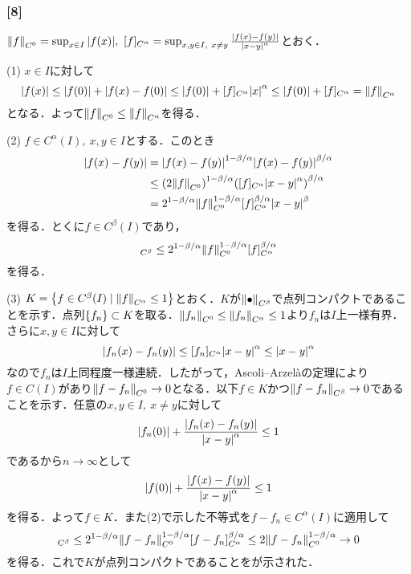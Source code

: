 \documentclass[a4j]{ltjsarticle}
\newcommand{\1}{\mathbbm{1}}
\numberwithin{equation}{section}
\theoremstyle{definition}
\begin{document}
\subsubsection*{[8]}
$\norm{f}_{C^0}=\sup_{x\in I}\abs{f(x)},\ [f]_{C^{\alpha}}=\sup_{x,y\in I,\ x\neq y}\frac{\abs{f(x)-f(y)}}{\abs{x-y}^{\alpha}}$とおく．

(1) $x\in I$に対して
\begin{equation}
    \abs{f(x)}\leq \abs{f(0)}+\abs{f(x)-f(0)}\leq \abs{f(0)}+[f]_{C^{\alpha}}\abs{x}^{\alpha}\leq \abs{f(0)}+[f]_{C^{\alpha}}=\norm{f}_{C^{\alpha}} 
\end{equation}
となる．よって$\norm{f}_{C^{0}}\leq \norm{f}_{C^\alpha}$を得る．

(2) $f\in C^\alpha(I),\ x,y\in I$とする．このとき
\begin{align}
    \abs{f(x)-f(y)}&=\abs{f(x)-f(y)}^{1-\beta/\alpha}\abs{f(x)-f(y)}^{\beta/\alpha}\\
    &\leq \qty(2\norm{f}_{C^{0}})^{1-\beta/\alpha}\qty([f]_{C^\alpha}\abs{x-y}^\alpha)^{\beta/\alpha}\\
    &=2^{1-\beta/\alpha}\norm{f}_{C^0}^{1-\beta/\alpha}[f]_{C^{\alpha}}^{\beta/\alpha}\abs{x-y}^\beta 
\end{align}
を得る．とくに$f\in C^\beta(I)$であり，
\begin{equation}
    [f]_{C^\beta}\leq 2^{1-\beta/\alpha}\norm{f}_{C^0}^{1-\beta/\alpha}[f]_{C^\alpha}^{\beta/\alpha }
\end{equation}
を得る．

(3) $K=\qty{f\in C^\beta(I)\mid \norm{f}_{C^\alpha}\leq 1}$とおく．$K$が$\norm{\bullet}_{C^\beta}$で点列コンパクトであることを示す．点列$\qty{f_n}\subset K$を取る．$\norm{f_n}_{C^0}\leq \norm{f_n}_{C^\alpha}\leq 1$より$f_n$は$I$上一様有界．さらに$x,y\in I$に対して
\begin{equation}
    \abs{f_n(x)-f_n(y)}\leq [f_n]_{C^\alpha}\abs{x-y}^{\alpha}\leq \abs{x-y}^{\alpha} 
\end{equation}
なので$f_n$は$I$上同程度一様連続．したがって，Ascoli--Arzelàの定理により$f\in C(I)$があり$\norm{f-f_n}_{C^0}\to0$となる．以下$f\in K$かつ$\norm{f-f_n}_{C^\beta}\to0$であることを示す．任意の$x,y\in I,\ x\neq y$に対して
\begin{equation}
    \abs{f_n(0)}+\frac{\abs{f_n(x)-f_n(y)}}{\abs{x-y}^\alpha}\leq 1
\end{equation}
であるから$n\to\infty$として
\begin{equation}
    \abs{f(0)}+\frac{\abs{f(x)-f(y)}}{\abs{x-y}^{\alpha}}\leq1
\end{equation}
を得る．よって$f\in K$．また(2)で示した不等式を$f-f_n\in C^\alpha(I)$に適用して
\begin{equation}
    [f-f_n]_{C^\beta}\leq 2^{1-\beta/\alpha}\norm{f-f_n}_{C^0}^{1-\beta/\alpha}[f-f_n]_{C^\alpha}^{\beta/\alpha}\leq 2\norm{f-f_n}_{C^0}^{1-\beta/\alpha}\to0
\end{equation}
を得る．これで$K$が点列コンパクトであることをが示された．
\end{document}
